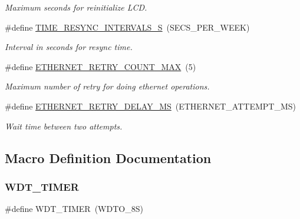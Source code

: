 \begin{DoxyCompactItemize}
\begin{DoxyCompactList}\small\item\em Maximum seconds for reinitialize L\+CD. \end{DoxyCompactList}\item 
\mbox{\label{rmap-config_8h_ab5d88aab471d5cac3392cae63b8684cf}} 
\#define \hyperlink{rmap-config_8h_ab5d88aab471d5cac3392cae63b8684cf}{T\+I\+M\+E\+\_\+\+R\+E\+S\+Y\+N\+C\+\_\+\+I\+N\+T\+E\+R\+V\+A\+L\+S\+\_\+S}~(S\+E\+C\+S\+\_\+\+P\+E\+R\+\_\+\+W\+E\+EK)
\begin{DoxyCompactList}\small\item\em Interval in seconds for resync time. \end{DoxyCompactList}\item 
\mbox{\label{rmap-config_8h_a743e7905c81f2b5b6bb32fc55a3c5494}} 
\#define \hyperlink{rmap-config_8h_a743e7905c81f2b5b6bb32fc55a3c5494}{E\+T\+H\+E\+R\+N\+E\+T\+\_\+\+R\+E\+T\+R\+Y\+\_\+\+C\+O\+U\+N\+T\+\_\+\+M\+AX}~(5)
\begin{DoxyCompactList}\small\item\em Maximum number of retry for doing ethernet operations. \end{DoxyCompactList}\item 
\mbox{\label{rmap-config_8h_aad84a5cc78471bbe08ae9b0f519866ea}} 
\#define \hyperlink{rmap-config_8h_aad84a5cc78471bbe08ae9b0f519866ea}{E\+T\+H\+E\+R\+N\+E\+T\+\_\+\+R\+E\+T\+R\+Y\+\_\+\+D\+E\+L\+A\+Y\+\_\+\+MS}~(E\+T\+H\+E\+R\+N\+E\+T\+\_\+\+A\+T\+T\+E\+M\+P\+T\+\_\+\+MS)
\begin{DoxyCompactList}\small\item\em Wait time between two attempts. \end{DoxyCompactList}\end{DoxyCompactItemize}


\subsection{Macro Definition Documentation}
\mbox{\label{rmap-config_8h_a983c9777673ee873f12ec9f489215321}} 
\subsubsection{\texorpdfstring{W\+D\+T\+\_\+\+T\+I\+M\+ER}{WDT\_TIMER}}
{\footnotesize\ttfamily \#define W\+D\+T\+\_\+\+T\+I\+M\+ER~(W\+D\+T\+O\+\_\+8S)}




